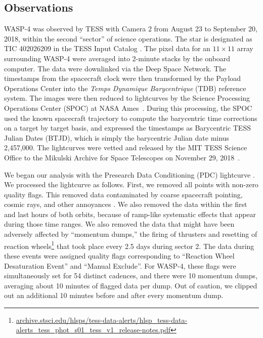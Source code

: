 \documentclass[12pt,twocolumn,tighten]{aastex62}
\begin{document}
\subsection{Observations}

WASP-4 was observed by TESS with Camera 2 from August 23 to September
20, 2018, within the second ``sector'' of science operations.  The
star is designated as TIC 402026209 in the TESS Input Catalog
\citep{stassun_TIC_2018}.  The pixel data for an $11\times11$ array
surrounding WASP-4 were averaged into 2-minute stacks by the onboard
computer.  The data were downlinked via the Deep Space Network. The
timestamps from the spacecraft clock were then transformed by the
Payload Operations Center into the {\it Temps Dynamique Barycentrique}
(TDB) reference system.  The images were then reduced to lightcurves
by the Science Processing Operations Center (SPOC) at NASA
Ames~\citep{jenkins_tess_2016}.  During this processing, the SPOC used
the known spacecraft trajectory to compute the barycentric time
corrections on a target by target basis, and expressed the timestamps
as Barycentric TESS Julian Dates (BTJD), which is simply the
barycentric Julian date minus 2{,}457{,}000.  The lightcurves were
vetted and released by the MIT TESS Science Office to the Mikulski
Archive for Space Telescopes on November 29,
2018~\citep{ricker_tess_alerts_2018}.

We began our analysis with the Presearch Data Conditioning (PDC)
lightcurve \citep{smith_kepler_apertures_2017,smith_kepler_PDC_2017}.
We processed the lightcurve as follows.  First, we removed all points
with non-zero quality flags.  This removed data contaminated by coarse
spacecraft pointing, cosmic rays, and other annoyances
\citep{tess_data_product_description_2018}.  We also removed the data
within the first and last hours of both orbits, because of ramp-like
systematic effects that appear during those time ranges. We also
removed the data that might have been adversely affected by ``momentum
dumps,'' the firing of thrusters and resetting of reaction wheels\footnote{\url{archive.stsci.edu/hlsps/tess-data-alerts/hlsp_tess-data-alerts_tess_phot_s01_tess_v1_release-notes.pdf}}
that took place every 2.5 days during sector 2.
The data during these events were assigned quality flags corresponding
to ``Reaction Wheel Desaturation Event'' and ``Manual Exclude''.  For
WASP-4, these flags were simultaneously set for 54 distinct cadences,
and there were 10 momentum dumps, averaging about 10 minutes of
flagged data per dump.  Out of caution, we clipped out an additional
10 minutes before and after every momentum dump.
\end{document}
